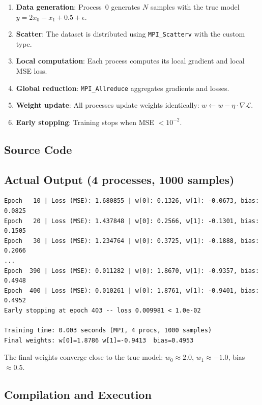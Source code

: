 \documentclass[11pt,a4paper]{article}
\begin{document}
\begin{enumerate}
    \item \textbf{Data generation}: Process~0 generates $N$ samples with the true model $y = 2x_0 - x_1 + 0.5 + \epsilon$.
    \item \textbf{Scatter}: The dataset is distributed using \texttt{MPI\_Scatterv} with the custom type.
    \item \textbf{Local computation}: Each process computes its local gradient and local MSE loss.
    \item \textbf{Global reduction}: \texttt{MPI\_Allreduce} aggregates gradients and losses.
    \item \textbf{Weight update}: All processes update weights identically: $w \leftarrow w - \eta \cdot \nabla\mathcal{L}$.
    \item \textbf{Early stopping}: Training stops when MSE $< 10^{-2}$.
\end{enumerate}

\subsection{Source Code}



\subsection{Actual Output (4 processes, 1000 samples)}

\begin{verbatim}
Epoch   10 | Loss (MSE): 1.680855 | w[0]: 0.1326, w[1]: -0.0673, bias: 0.0825
Epoch   20 | Loss (MSE): 1.437848 | w[0]: 0.2566, w[1]: -0.1301, bias: 0.1505
Epoch   30 | Loss (MSE): 1.234764 | w[0]: 0.3725, w[1]: -0.1888, bias: 0.2066
...
Epoch  390 | Loss (MSE): 0.011282 | w[0]: 1.8670, w[1]: -0.9357, bias: 0.4948
Epoch  400 | Loss (MSE): 0.010261 | w[0]: 1.8761, w[1]: -0.9401, bias: 0.4952
Early stopping at epoch 403 -- loss 0.009981 < 1.0e-02

Training time: 0.003 seconds (MPI, 4 procs, 1000 samples)
Final weights: w[0]=1.8786 w[1]=-0.9413  bias=0.4953
\end{verbatim}

The final weights converge close to the true model: $w_0 \approx 2.0$, $w_1 \approx -1.0$, bias $\approx 0.5$.

\subsection{Compilation and Execution}
\end{document}
